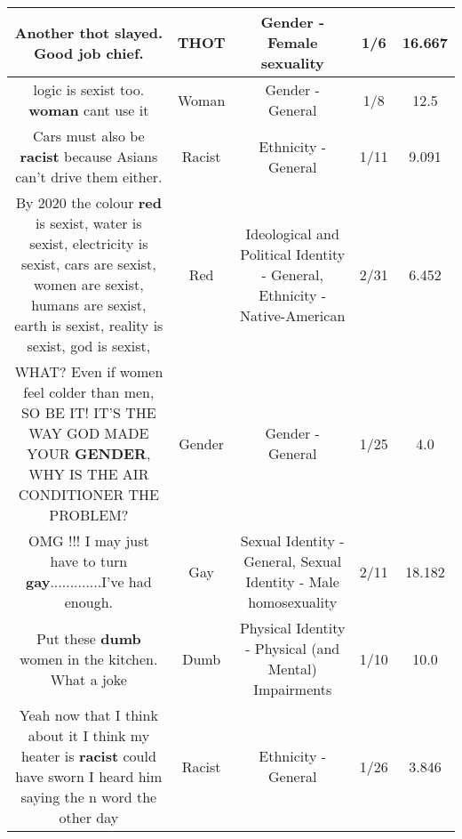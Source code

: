 \documentclass[11pt]{article}
\newlength\mylength
\begin{document}
\begin{center}
\begin{longtable}{|C{.65\mylength}|C{.30\mylength}|C{.12\mylength}|C{.12\mylength}|C{.12\mylength}|}
  \small Another \textbf{thot} slayed. Good job chief.\normalsize   & THOT & Gender - Female sexuality & 1/6 & 16.667 \\  \hline
  \small logic is sexist too. \textbf{woman} cant use it\normalsize   & Woman & Gender - General & 1/8 & 12.5 \\  \hline
  \small Cars must also be \textbf{racist} because Asians can't drive them either.\normalsize   & Racist & Ethnicity - General & 1/11 & 9.091 \\  \hline
  \small By 2020 the colour \textbf{r\textbf{ed}} is sexist, water is sexist, electricity is sexist, cars are sexist, women are sexist, humans are sexist, earth is sexist, reality is sexist, god is sexist,\normalsize   & Red &  Ideological and Political Identity - General, Ethnicity - Native-American & 2/31 & 6.452 \\  \hline
  \small WHAT? Even if women feel colder than men, SO BE IT! IT'S THE WAY GOD MADE YOUR \textbf{GENDER}, WHY IS THE AIR CONDITIONER THE PROBLEM?\normalsize   & Gender & Gender - General & 1/25 & 4.0 \\  \hline
  \small OMG !!! I may just have to turn \textbf{g\textbf{ay}}.............I've had enough.\normalsize   & Gay & Sexual Identity - General, Sexual Identity - Male homosexuality & 2/11 & 18.182 \\  \hline
  \small Put these \textbf{dumb} women in the kitchen. What a joke\normalsize   & Dumb & Physical Identity - Physical (and Mental) Impairments & 1/10 & 10.0 \\  \hline
  \small Yeah now that I think about it I think my heater is \textbf{racist} could have sworn I heard him saying the n word the other day\normalsize   & Racist & Ethnicity - General & 1/26 & 3.846 \\  \hline

\end{longtable}
\end{center}
\end{document}
